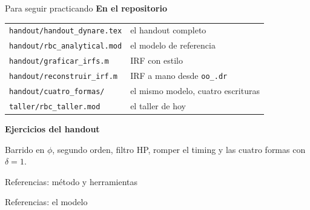 \begin{frame}[label=material]{Para seguir practicando}
  \textbf{En el repositorio}\par
  \vspace{0.15cm}
  \small
  \begin{tabular}{@{}ll@{}}
    \texttt{handout/handout\_dynare.tex} & el handout completo\\
    \texttt{handout/rbc\_analytical.mod} & el modelo de referencia\\
    \texttt{handout/graficar\_irfs.m} & IRF con estilo\\
    \texttt{handout/reconstruir\_irf.m} & IRF a mano desde \texttt{oo\_.dr}\\
    \texttt{handout/cuatro\_formas/} & el mismo modelo, cuatro escrituras\\
    \texttt{taller/rbc\_taller.mod} & el taller de hoy
  \end{tabular}
  \par\vspace{0.4cm}\normalsize
  \textbf{Ejercicios del handout}\par
  \vspace{0.15cm}
  Barrido en $\phi$, segundo orden, filtro HP, romper el timing y las cuatro formas con
  $\delta=1$.
\end{frame}

\begin{frame}[label=referencias]{Referencias: método y herramientas}
  \renewcommand*{\bibfont}{\footnotesize}
  \printbibliography[heading=none,keyword=metodo]
\end{frame}

\begin{frame}[label=referencias-modelo]{Referencias: el modelo}
  \renewcommand*{\bibfont}{\footnotesize}
  \printbibliography[heading=none,keyword=modelo]
\end{frame}
